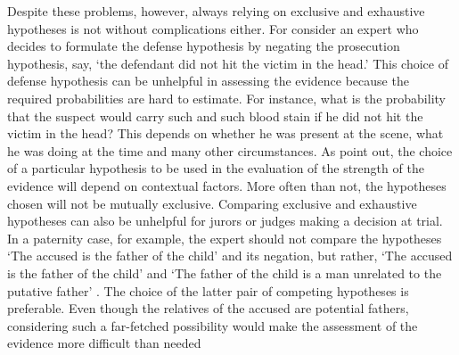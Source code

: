 \documentclass{article}
\begin{document}
Despite these problems, however, always relying on exclusive and exhaustive hypotheses is not without complications either. For consider an expert who decides to formulate the defense hypothesis by negating the prosecution hypothesis, say, `the defendant did not hit the victim in the head.' This choice of defense hypothesis can be unhelpful in assessing the evidence because the required probabilities are hard to estimate. For instance, what is the probability that the suspect would carry such and such blood stain if he did not hit the victim in the head? This depends on whether he was present at the scene, what he was doing at the time and many other circumstances. %
As \citet{evett2000MoreHierarchyPropositions} point out, the choice of a particular hypothesis to be used in the evaluation of the strength of the evidence 
will depend on contextual factors. %
More often than not, the hypotheses chosen will not be mutually exclusive. 
%
Comparing exclusive and exhaustive hypotheses can also be unhelpful for jurors or judges making a decision at trial.
In a paternity case, for example, %
the expert should not compare the hypotheses `The accused is the father of the child' and  its negation, but rather, `The accused is the father of the child' and  `The father of the child is a man unrelated to the putative father' \citep{biedermann2014UseLikelihoodRatio}. The choice of the latter pair of competing hypotheses is preferable. Even though the relatives of the accused are potential fathers, considering such a far-fetched possibility would make the assessment of the evidence more difficult than needed  %
%
\end{document}
